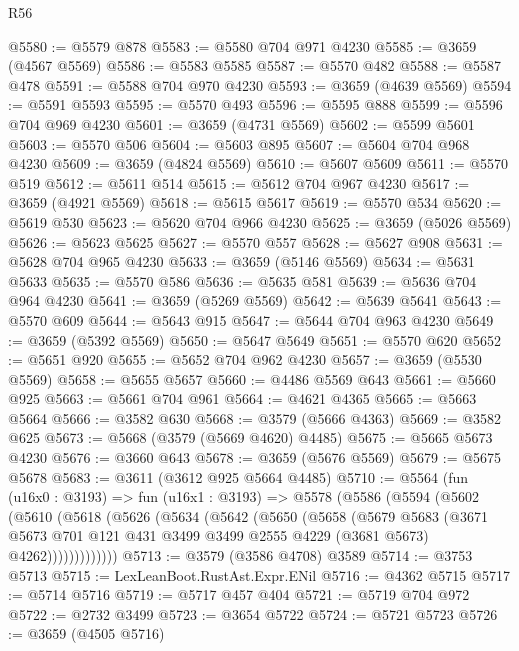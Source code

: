 \begin{lexlean}{R56}
\begin{coremodule}
@5580 := @5579 @878
@5583 := @5580 @704 @971 @4230
@5585 := @3659 (@4567 @5569)
@5586 := @5583 @5585
@5587 := @5570 @482
@5588 := @5587 @478
@5591 := @5588 @704 @970 @4230
@5593 := @3659 (@4639 @5569)
@5594 := @5591 @5593
@5595 := @5570 @493
@5596 := @5595 @888
@5599 := @5596 @704 @969 @4230
@5601 := @3659 (@4731 @5569)
@5602 := @5599 @5601
@5603 := @5570 @506
@5604 := @5603 @895
@5607 := @5604 @704 @968 @4230
@5609 := @3659 (@4824 @5569)
@5610 := @5607 @5609
@5611 := @5570 @519
@5612 := @5611 @514
@5615 := @5612 @704 @967 @4230
@5617 := @3659 (@4921 @5569)
@5618 := @5615 @5617
@5619 := @5570 @534
@5620 := @5619 @530
@5623 := @5620 @704 @966 @4230
@5625 := @3659 (@5026 @5569)
@5626 := @5623 @5625
@5627 := @5570 @557
@5628 := @5627 @908
@5631 := @5628 @704 @965 @4230
@5633 := @3659 (@5146 @5569)
@5634 := @5631 @5633
@5635 := @5570 @586
@5636 := @5635 @581
@5639 := @5636 @704 @964 @4230
@5641 := @3659 (@5269 @5569)
@5642 := @5639 @5641
@5643 := @5570 @609
@5644 := @5643 @915
@5647 := @5644 @704 @963 @4230
@5649 := @3659 (@5392 @5569)
@5650 := @5647 @5649
@5651 := @5570 @620
@5652 := @5651 @920
@5655 := @5652 @704 @962 @4230
@5657 := @3659 (@5530 @5569)
@5658 := @5655 @5657
@5660 := @4486 @5569 @643
@5661 := @5660 @925
@5663 := @5661 @704 @961
@5664 := @4621 @4365
@5665 := @5663 @5664
@5666 := @3582 @630
@5668 := @3579 (@5666 @4363)
@5669 := @3582 @625
@5673 := @5668 (@3579 (@5669 @4620) @4485)
@5675 := @5665 @5673 @4230
@5676 := @3660 @643
@5678 := @3659 (@5676 @5569)
@5679 := @5675 @5678
@5683 := @3611 (@3612 @925 @5664 @4485)
@5710 := @5564
    (fun (u16x0 : @3193) =>
    fun (u16x1 : @3193) =>
    @5578
      (@5586
        (@5594
          (@5602
            (@5610
              (@5618
                (@5626
                  (@5634
                    (@5642
                      (@5650
                        (@5658
                          (@5679
                            @5683
                            (@3671
                              @5673
                              @701
                              @121
                              @431
                              @3499
                              @3499
                              @2555
                              @4229
                              (@3681 @5673)
                              @4262)))))))))))))
@5713 := @3579 (@3586 @4708) @3589
@5714 := @3753 @5713
@5715 := LexLeanBoot.RustAst.Expr.ENil
@5716 := @4362 @5715
@5717 := @5714 @5716
@5719 := @5717 @457 @404
@5721 := @5719 @704 @972
@5722 := @2732 @3499
@5723 := @3654 @5722
@5724 := @5721 @5723
@5726 := @3659 (@4505 @5716)

\end{coremodule}
\end{lexlean}
